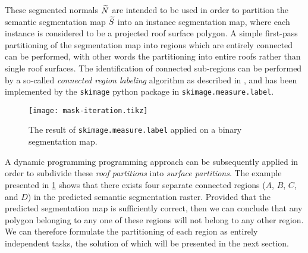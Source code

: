 \noindent
These segmented normals $\widetilde{N}$ are intended to be used in order to partition the semantic segmentation map $\widetilde{S}$ into an instance segmentation map, where each instance is considered to be a projected roof surface polygon.
A simple first-pass partitioning of the segmentation map into regions which are entirely connected can be performed, with other words the partitioning into entire roofs rather than single roof surfaces.
The identification of connected sub-regions can be performed by a so-called \textit{connected region labeling} algorithm as described in \cite{sklabel1,sklabel2}, and has been implemented by the \texttt{skimage} python package in \texttt{skimage.measure.label}.
\begin{figure}[H]
  \centering
  \texttt{[image: mask-iteration.tikz]}
  \caption{The result of \texttt{skimage.measure.label} applied on a binary segmentation map.}%
  \label{fig:mask-iteration}
\end{figure}
\noindent
A dynamic programming programming approach can be subsequently applied in order to subdivide these \textit{roof partitions} into \textit{surface partitions}.
The example presented in \cref{fig:mask-iteration} shows that there exists four separate connected regions ($A$, $B$, $C$, and $D$) in the predicted semantic segmentation raster.
Provided that the predicted segmentation map is sufficiently correct, then we can conclude that any polygon belonging to any one of these regions will not belong to any other region.
We can therefore formulate the partitioning of each region as entirely independent tasks, the solution of which will be presented in the next section.
